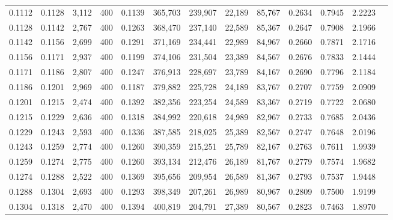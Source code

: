 \begin{tabular}{rrrrrrrrrrrrr}
0.1112 & 0.1128 &  3,112 &   400 &                                     0.1139 & 365,703 & 239,907 &  22,189 &  85,767 & 0.2634 & 0.7945 & 2.2223 \\
0.1128 & 0.1142 &  2,767 &   400 &                                     0.1263 & 368,470 & 237,140 &  22,589 &  85,367 & 0.2647 & 0.7908 & 2.1966 \\
0.1142 & 0.1156 &  2,699 &   400 &                                     0.1291 & 371,169 & 234,441 &  22,989 &  84,967 & 0.2660 & 0.7871 & 2.1716 \\
0.1156 & 0.1171 &  2,937 &   400 &                                     0.1199 & 374,106 & 231,504 &  23,389 &  84,567 & 0.2676 & 0.7833 & 2.1444 \\
0.1171 & 0.1186 &  2,807 &   400 &                                     0.1247 & 376,913 & 228,697 &  23,789 &  84,167 & 0.2690 & 0.7796 & 2.1184 \\
0.1186 & 0.1201 &  2,969 &   400 &                                     0.1187 & 379,882 & 225,728 &  24,189 &  83,767 & 0.2707 & 0.7759 & 2.0909 \\
0.1201 & 0.1215 &  2,474 &   400 &                                     0.1392 & 382,356 & 223,254 &  24,589 &  83,367 & 0.2719 & 0.7722 & 2.0680 \\
0.1215 & 0.1229 &  2,636 &   400 &                                     0.1318 & 384,992 & 220,618 &  24,989 &  82,967 & 0.2733 & 0.7685 & 2.0436 \\
0.1229 & 0.1243 &  2,593 &   400 &                                     0.1336 & 387,585 & 218,025 &  25,389 &  82,567 & 0.2747 & 0.7648 & 2.0196 \\
0.1243 & 0.1259 &  2,774 &   400 &                                     0.1260 & 390,359 & 215,251 &  25,789 &  82,167 & 0.2763 & 0.7611 & 1.9939 \\
0.1259 & 0.1274 &  2,775 &   400 &                                     0.1260 & 393,134 & 212,476 &  26,189 &  81,767 & 0.2779 & 0.7574 & 1.9682 \\
0.1274 & 0.1288 &  2,522 &   400 &                                     0.1369 & 395,656 & 209,954 &  26,589 &  81,367 & 0.2793 & 0.7537 & 1.9448 \\
0.1288 & 0.1304 &  2,693 &   400 &                                     0.1293 & 398,349 & 207,261 &  26,989 &  80,967 & 0.2809 & 0.7500 & 1.9199 \\
0.1304 & 0.1318 &  2,470 &   400 &                                     0.1394 & 400,819 & 204,791 &  27,389 &  80,567 & 0.2823 & 0.7463 & 1.8970 \\

\end{tabular}
